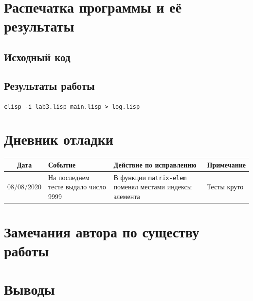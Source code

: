 \documentclass[12pt]{article}
\begin{document}
\section{Распечатка программы и её результаты}

\subsection{Исходный код}

\subsection{Результаты работы}
\lstinline{clisp -i lab3.lisp main.lisp > log.lisp}

\section{Дневник отладки}
\noindent
\begin{tabularx}{\linewidth}{|c|X|X|X|}
\hline
Дата & Событие & Действие по исправлению & Примечание \\
\hline
08/08/2020 & На последнем тесте выдало число 9999 & В функции {\tt matrix-elem} поменял местами индексы элемента & Тесты круто \\
\hline
\end{tabularx}

\section{Замечания автора по существу работы}

\section{Выводы}
\end{document}

